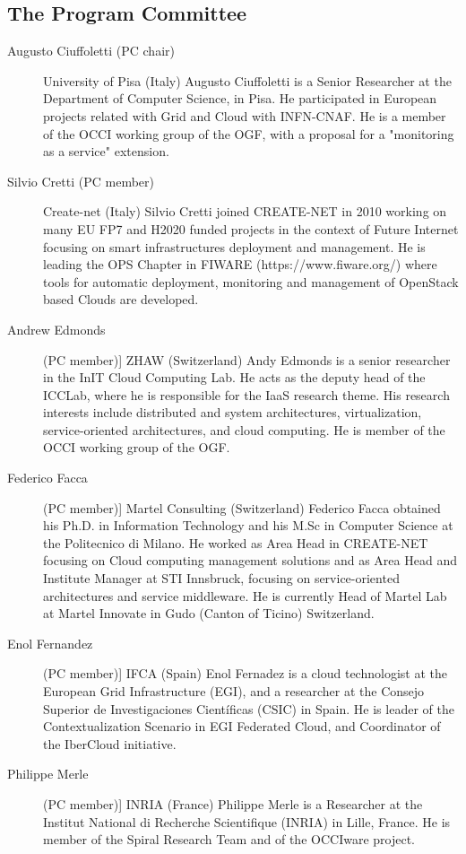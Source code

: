 \documentclass[10pt,a4paper]{article}
\begin{document}
\subsection*{The Program Committee}
\begin{description}
	\item[Augusto Ciuffoletti (PC chair)] University of Pisa (Italy)
	Augusto Ciuffoletti is a Senior Researcher at the Department of Computer Science, in Pisa. He participated in European projects related with Grid and Cloud with INFN-CNAF. He is a member of the OCCI working group of the OGF, with a proposal for a "monitoring as a service" extension.
	\item[Silvio Cretti (PC member)] Create-net (Italy)
	Silvio Cretti joined CREATE-NET in 2010 working on many EU FP7 and H2020 funded projects in the context of Future Internet focusing on smart infrastructures deployment and management. He is leading the OPS Chapter in FIWARE (https://www.fiware.org/) where tools for automatic deployment, monitoring and management of OpenStack based Clouds are developed.
	\item[Andrew Edmonds] (PC member)] ZHAW (Switzerland)
	Andy Edmonds is a  senior researcher in the InIT Cloud Computing Lab. He acts as the deputy head of the ICCLab, where he is responsible for the IaaS research theme. His research interests include distributed and system architectures, virtualization, service-oriented architectures, and cloud computing. He is member of the OCCI working group of the OGF.
	\item[Federico Facca] (PC member)] Martel Consulting (Switzerland)
	Federico Facca obtained his Ph.D. in Information Technology and his M.Sc in Computer Science at the Politecnico di Milano. He worked as Area Head in CREATE-NET focusing on Cloud computing management solutions and as Area Head and Institute Manager at STI Innsbruck, focusing on service-oriented architectures and service middleware. He is currently Head of Martel Lab at Martel Innovate in Gudo (Canton of Ticino) Switzerland.
	\item[Enol Fernandez] (PC member)] IFCA (Spain)
	Enol Fernadez is a cloud technologist at the European Grid Infrastructure (EGI), and  a researcher at the Consejo Superior de Investigaciones Científicas (CSIC) in Spain. He is leader of the Contextualization Scenario in EGI Federated Cloud, and Coordinator of the IberCloud initiative.
	\item[Philippe Merle] (PC member)] INRIA (France)
	Philippe Merle is a Researcher at the Institut National di Recherche Scientifique (INRIA) in Lille, France. He is member of the Spiral Research Team and of the OCCIware project.

\end{description}
\end{document}
